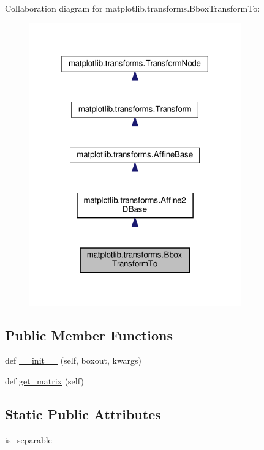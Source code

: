 Collaboration diagram for matplotlib.\+transforms.\+Bbox\+Transform\+To\+:
\nopagebreak
\begin{figure}[H]
\begin{center}
\leavevmode
\includegraphics[width=259pt]{classmatplotlib_1_1transforms_1_1BboxTransformTo__coll__graph}
\end{center}
\end{figure}
\subsection*{Public Member Functions}
\begin{DoxyCompactItemize}
\item 
def \hyperlink{classmatplotlib_1_1transforms_1_1BboxTransformTo_abad16264da08ba0002f3fb6791b86e5d}{\+\_\+\+\_\+init\+\_\+\+\_\+} (self, boxout, kwargs)
\item 
def \hyperlink{classmatplotlib_1_1transforms_1_1BboxTransformTo_a3cb016665e262e95f16e72f5e04976b9}{get\+\_\+matrix} (self)
\end{DoxyCompactItemize}
\subsection*{Static Public Attributes}
\begin{DoxyCompactItemize}
\item 
\hyperlink{classmatplotlib_1_1transforms_1_1BboxTransformTo_aa5ac9aa12bc4bf73f054f9d5d5b8c7d1}{is\+\_\+separable}
\end{DoxyCompactItemize}


